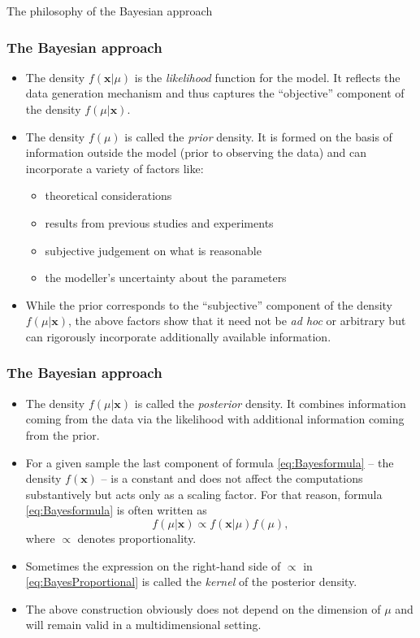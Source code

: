 \documentclass[10pt]{beamer}
\theoremstyle{definition}
\begin{document}
\begin{section}{The philosophy of the Bayesian approach}
\begin{frame}
\frametitle{The Bayesian approach}
\begin{itemize}\itemsep1em
\item The density $ f(\mathbf{x}|\mu) $ is the \emph{likelihood} function for the model. It reflects the data generation mechanism and thus captures the ``objective'' component of the density $f(\mu|\mathbf{x})$.
\item The density $ f(\mu) $ is called the \emph{prior} density. It is formed on the basis of information outside the model (prior to observing the data) and can incorporate a variety of factors like:
	\begin{itemize}\itemsep1em
	\item theoretical considerations
	\item results from previous studies and experiments
	\item subjective judgement on what is reasonable
	\item the modeller's uncertainty about the parameters
	\end{itemize}
\item While the prior corresponds to the ``subjective'' component of the density $f(\mu|\mathbf{x})$, the above factors show that it need not be \emph{ad hoc} or arbitrary but can rigorously incorporate additionally available information.
\end{itemize}
\end{frame}

\begin{frame}
\frametitle{The Bayesian approach}
\begin{itemize}\itemsep1em
\item The density $f(\mu|\mathbf{x})$ is called the \emph{posterior} density. It combines information coming from the data via the likelihood with additional information coming from the prior.
\item For a given sample the last component of formula \eqref{eq:Bayesformula} -- the density $f(\mathbf{x})$ -- is a constant and does not affect the computations substantively but acts only as a scaling factor. For that reason, formula \eqref{eq:Bayesformula} is often written as
\begin{equation}
\label{eq:BayesProportional}f(\mu|\mathbf{x})\propto
f(\mathbf{x}|\mu)f(\mu),
\end{equation}where $\propto$ denotes proportionality.
\item Sometimes the expression on the right-hand side of $ \propto $ in \eqref{eq:BayesProportional} is called the \emph{kernel} of the posterior density.
\item The above construction obviously does not depend on the dimension of $ \mu $ and will remain valid in a multidimensional setting.
\end{itemize}
\end{frame}


\end{section}
\end{document}
